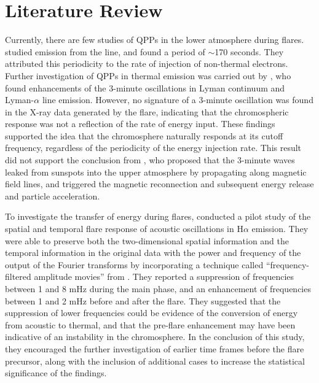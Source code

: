 \section{Literature Review}




Currently, there are few studies of QPPs in the lower atmosphere during flares.
\citep{Brosius2016} studied emission from the  line, and found
a period of $\sim$170 seconds. They
attributed this periodicity to the rate of injection of
non-thermal electrons.
Further investigation of QPPs in thermal emission was carried out by
\cite{Milligan2017}, who found enhancements of the 3-minute oscillations
in Lyman continuum and Lyman-$\alpha$ line emission.
However, no signature of a 3-minute oscillation was found in
the X-ray data generated by the flare, indicating
that the chromospheric response was not a
reflection of the rate of energy input.
These findings supported the idea that the chromosphere naturally
responds at its cutoff frequency, regardless of the periodicity of the
energy injection rate.
This result did not support the conclusion from
\cite{Sych2009}, who
proposed that the 3-minute waves leaked from sunspots into the upper
atmosphere by propagating along magnetic field lines, and triggered
the magnetic reconnection and subsequent energy release and particle
acceleration.


To investigate the transfer of energy during flares, \cite{Monsue2016}
conducted a pilot study of the spatial and temporal flare response of acoustic
oscillations in H$\alpha$ emission.
They were able to preserve both the two-dimensional spatial information
and the temporal information in the original data
with the power and frequency of the output of the Fourier transforms
by incorporating a technique called ``frequency-filtered amplitude movies''
from \cite{Jackiewicz2013}.
They reported a suppression of frequencies
between 1 and 8 mHz during the main phase, and an enhancement of frequencies
between 1 and 2 mHz before and after the flare. They suggested that the
suppression of lower frequencies could be evidence of the conversion of energy
from acoustic to thermal, and that the pre-flare enhancement may have been
indicative of an instability in the chromosphere.
In the conclusion of this study, they encouraged
the further investigation of
earlier time frames before the flare precursor, along with the
inclusion of additional cases to increase the statistical significance of the
findings.

